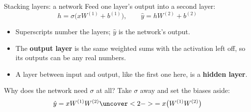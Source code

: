 \documentclass[aspectratio=169,11pt,t,\primeropts]{beamer}
\begin{document}
\begin{frame}{Stacking layers: a network}
  Feed one layer's output into a second layer:
  \[
    h = \sigma\big(xW^{(1)} + b^{(1)}\big), \qquad \hat{y} = h W^{(2)} + b^{(2)}
  \]
  \begin{itemize}
    \item Superscripts number the layers; $\hat{y}$ is the network's output.
    \item The \textbf{output layer} is the same weighted sums with the activation left off, so
      its outputs can be any real numbers.
    \item A layer between input and output, like the first one here, is a \textbf{hidden layer}.
  \end{itemize}
\end{frame}

\begin{frame}{Why does the network need \texorpdfstring{$\sigma$}{the activation} at all?}
  Take $\sigma$ away and set the biases aside:
  \[
    \hat{y} = x W^{(1)} W^{(2)} \uncover<2->{= x\big(W^{(1)} W^{(2)}\big)}
  \]
\end{frame}
\end{document}
